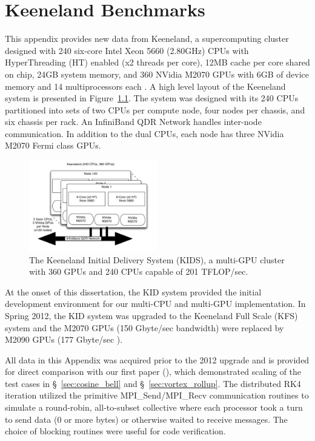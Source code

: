
\chapter{Keeneland Benchmarks}
\label{app:keeneland_alltoallv_benchmarks}

This appendix provides new data from Keeneland, a supercomputing cluster designed with 240 six-core Intel Xeon 5660 (2.80GHz) CPUs with HyperThreading (HT) enabled (x2 threads per core), 12MB cache per core shared on chip, 24GB system memory, and 360 NVidia M2070 GPUs with 6GB of device memory and 14 multiprocessors each \cite{Vetter2011}.  A high level layout of the Keeneland system is presented in Figure~\ref{fig:keeneland}. The system was designed with its 240 CPUs partitioned into sets of two CPUs per compute node, four nodes per chassis, and six chassis per rack. An InfiniBand QDR Network handles inter-node communication. In addition to the dual CPUs, each node has three NVidia M2070 Fermi class GPUs.

\begin{figure}
\centering
\includegraphics[width=0.5\textwidth]{../figures/omnigraffle/Keeneland.pdf}
\caption{The Keeneland Initial Delivery System (KIDS), a multi-GPU cluster with 360 GPUs and 240 CPUs capable of 201 TFLOP/sec.}
\label{fig:keeneland}
\end{figure}

At the onset of this dissertation, the KID system provided the initial development environment for our multi-CPU and multi-GPU implementation. In Spring 2012, the KID system was upgraded to the Keeneland Full Scale (KFS) system and the M2070 GPUs (150 Gbyte/sec bandwidth) were replaced by M2090 GPUs (177 Gbyte/sec \cite{M2090}). 

All data in this Appendix was acquired prior to the 2012 upgrade and is provided for direct comparison with our first paper (\cite{BolligFlyerErlebacher2012}), which demonstrated scaling of the test cases in \S~\ref{sec:cosine_bell} and \S~\ref{sec:vortex_rollup}. The distributed RK4 iteration utilized the primitive MPI\_Send/MPI\_Recv communication routines to simulate a round-robin, all-to-subset collective where each processor took a turn to send data (0 or more bytes) or otherwise waited to receive messages. The choice of blocking routines were useful for code verification. 

